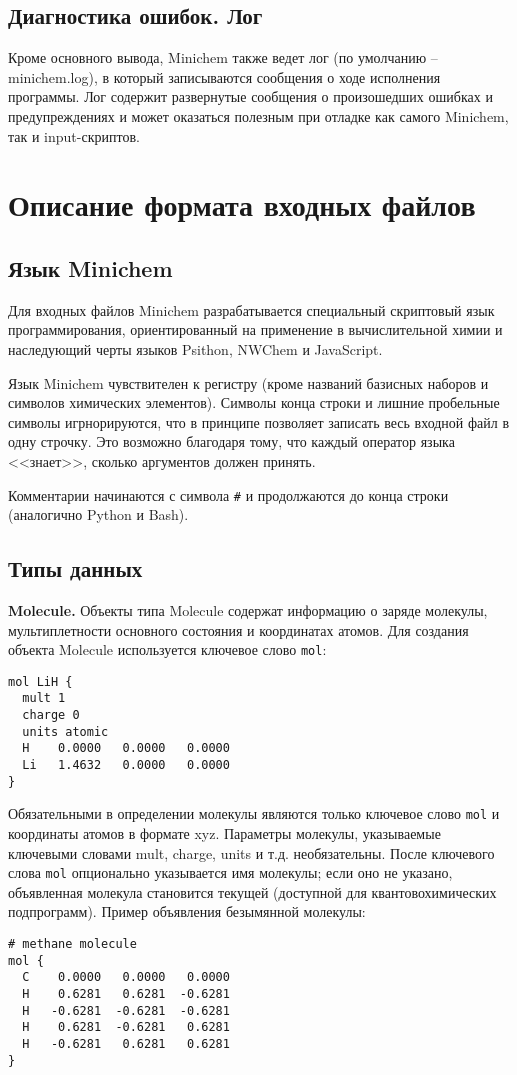 \documentclass[a4paper]{book}
\begin{document}
\section{Диагностика ошибок. Лог}
Кроме основного вывода, Minichem также ведет лог
(по умолчанию -- minichem.log), в который записываются сообщения о ходе исполнения программы. Лог содержит развернутые сообщения о произошедших
ошибках и предупреждениях и может оказаться полезным при отладке как самого Minichem, так и input-скриптов.

\chapter{Описание формата входных файлов}
\section{Язык Minichem}
Для входных файлов Minichem разрабатывается специальный скриптовый язык программирования, ориентированный на применение в вычислительной химии
и наследующий черты языков Psithon, NWChem и JavaScript.

Язык Minichem чувствителен к регистру (кроме названий базисных наборов и символов химических элементов). Символы конца строки и лишние пробельные символы
игрнорируются, что в принципе позволяет записать весь входной файл в одну строчку. Это возможно благодаря тому, что каждый оператор языка <<знает>>, сколько
аргументов должен принять.

Комментарии начинаются с символа \texttt{\#} и продолжаются до конца строки (аналогично Python и Bash).

\section{Типы данных}
\textbf{Molecule.} Объекты типа Molecule содержат информацию о заряде молекулы, мультиплетности основного состояния и координатах атомов.
Для создания объекта Molecule используется ключевое слово \texttt{mol}:
\begin{lstlisting}
mol LiH {
  mult 1
  charge 0
  units atomic
  H    0.0000   0.0000   0.0000
  Li   1.4632   0.0000   0.0000
}
\end{lstlisting}
Обязательными в определении молекулы являются только ключевое слово \texttt{mol} и координаты атомов в формате xyz.
Параметры молекулы, указываемые ключевыми словами mult, charge, units и т.д. необязательны.
После ключевого слова \texttt{mol} опционально указывается имя молекулы; если оно не указано, объявленная
молекула становится текущей (доступной для квантовохимических подпрограмм). Пример объявления безымянной молекулы:
\begin{lstlisting}
# methane molecule
mol {
  C    0.0000   0.0000   0.0000
  H    0.6281   0.6281  -0.6281
  H   -0.6281  -0.6281  -0.6281
  H    0.6281  -0.6281   0.6281
  H   -0.6281   0.6281   0.6281
}
\end{lstlisting}
\end{document}
